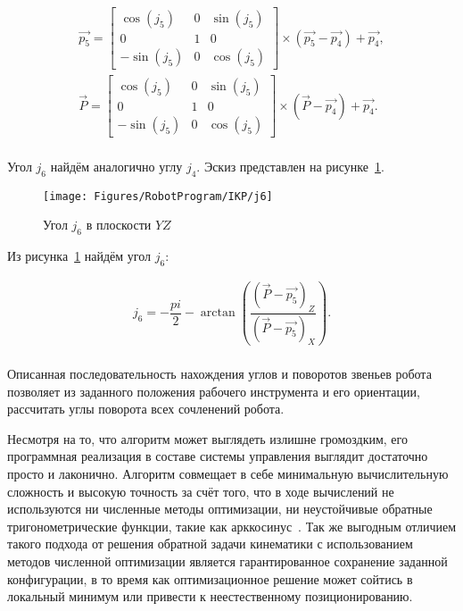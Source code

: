 \begin{gather*}
    \overrightarrow{p_5} =
    \begin{bmatrix}
        \cos(j_5)  & 0 & \sin(j_5) \\
        0          & 1 & 0         \\
        -\sin(j_5) & 0 & \cos(j_5)
    \end{bmatrix} \times \left( \overrightarrow{p_5} - \overrightarrow{p_4} \right) + \overrightarrow{p_4}, \\
    \overrightarrow{P} =
    \begin{bmatrix}
        \cos(j_5)  & 0 & \sin(j_5) \\
        0          & 1 & 0         \\
        -\sin(j_5) & 0 & \cos(j_5)
    \end{bmatrix} \times \left( \overrightarrow{P} - \overrightarrow{p_4} \right) + \overrightarrow{p_4}.
\end{gather*} \\

Угол $j_6$ найдём аналогично углу $j_4$.
Эскиз представлен на рисунке~\ref{fig:RobotProgram:IKP:j6}.

\begin{figure}[H]
    \centering
    \vspace{14pt}
    \texttt{[image: Figures/RobotProgram/IKP/j6]}
    \caption{Угол $j_6$ в плоскости $YZ$}
    \label{fig:RobotProgram:IKP:j6}
\end{figure}

Из рисунка~\ref{fig:RobotProgram:IKP:j6} найдём угол $j_6$:

\begin{gather*}
    j_6 = -\dfrac{pi}{2} - \arctan \left( \dfrac
    {\left( \overrightarrow{P} - \overrightarrow{p_5} \right)_Z}
    {\left( \overrightarrow{P} - \overrightarrow{p_5} \right)_X} \right).
\end{gather*} \\

Описанная последовательность нахождения углов и поворотов звеньев робота позволяет из заданного положения рабочего инструмента и его ориентации, рассчитать углы поворота всех сочленений робота.

Несмотря на то, что алгоритм может выглядеть излишне громоздким, его программная реализация в составе системы управления выглядит достаточно просто и лаконично.
Алгоритм совмещает в себе минимальную вычислительную сложность и высокую точность за счёт того, что в ходе вычислений не используются ни численные методы оптимизации, ни неустойчивые обратные тригонометрические функции, такие как арккосинус~\cite{bib:Fu_1987}.
Так же выгодным отличием такого подхода от решения обратной задачи кинематики с использованием методов численной оптимизации является гарантированное сохранение заданной конфигурации, в то время как оптимизационное решение может сойтись в локальный минимум или привести к неестественному позиционированию.
